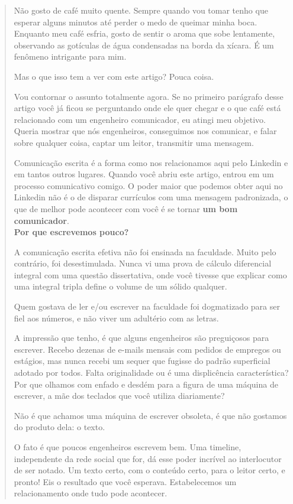 \documentclass[
  12pt,
]{article}
\begin{document}
\begin{quote}
Não gosto de café muito quente. Sempre quando vou tomar tenho que esperar alguns minutos até perder o medo de queimar minha boca. Enquanto meu café esfria, gosto de sentir o aroma que sobe lentamente, observando as gotículas de água condensadas na borda da xícara. É um fenômeno intrigante para mim.

Mas o que isso tem a ver com este artigo? Pouca coisa.

Vou contornar o assunto totalmente agora. Se no primeiro parágrafo desse artigo você já ficou se perguntando onde ele quer chegar e o que café está relacionado com um engenheiro comunicador, eu atingi meu objetivo. Queria mostrar que nós engenheiros, conseguimos nos comunicar, e falar sobre qualquer coisa, captar um leitor, transmitir uma mensagem.

Comunicação escrita é a forma como nos relacionamos aqui pelo Linkedin e em tantos outros lugares. Quando você abriu este artigo, entrou em um processo comunicativo comigo. O poder maior que podemos obter aqui no Linkedin não é o de disparar currículos com uma mensagem padronizada, o que de melhor pode acontecer com você é se tornar \textbf{um bom comunicador}.\\

\textbf{Por que escrevemos pouco?}

A comunicação escrita efetiva não foi ensinada na faculdade. Muito pelo contrário, foi desestimulada. Nunca vi uma prova de cálculo diferencial integral com uma questão dissertativa, onde você tivesse que explicar como uma integral tripla define o volume de um sólido qualquer.

Quem gostava de ler e/ou escrever na faculdade foi dogmatizado para ser fiel aos números, e não viver um adultério com as letras.

A impressão que tenho, é que alguns engenheiros são preguiçosos para escrever. Recebo dezenas de e-mails mensais com pedidos de empregos ou estágios, mas nunca recebi um sequer que fugisse do padrão superficial adotado por todos. Falta originalidade ou é uma displicência característica? Por que olhamos com enfado e desdém para a figura de uma máquina de escrever, a mãe dos teclados que você utiliza diariamente?

Não é que achamos uma máquina de escrever obsoleta, é que não gostamos do produto dela: o texto.

O fato é que poucos engenheiros escrevem bem. Uma timeline, independente da rede social que for, dá esse poder incrível ao interlocutor de ser notado. Um texto certo, com o conteúdo certo, para o leitor certo, e pronto! Eis o resultado que você esperava. Estabelecemos um relacionamento onde tudo pode acontecer.


\end{quote}
\end{document}
